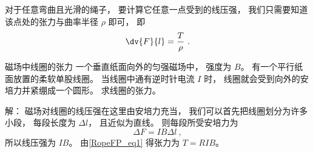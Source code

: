 对于任意弯曲且光滑的绳子， 要计算它任意一点受到的线压强， 我们只需要知道该点处的张力与曲率半径 $\rho$ 即可， 即
\begin{equation}
\dv{F}{l} = \frac{T}{\rho}~.
\end{equation}

\begin{example}{磁场中线圈的张力}
一个垂直纸面向外的匀强磁场中， 强度为 $B$。 有一个平行纸面放置的柔软单股线圈。 当线圈中通有逆时针电流 $I$ 时， 线圈就会受到向外的安培力并紧绷成一个圆形。 求线圈的张力。

解： 磁场对线圈的线压强在这里由安培力充当， 我们可以首先把线圈划分为许多小段， 每段长度为 $\Delta l$， 且近似为直线。 则每段所受安培力为
\begin{equation}
\Delta F = IB\Delta l~,
\end{equation}
所以线压强为 $IB$。 由\autoref{RopeFP_eq1} 得张力为 $T = RIB$。
\end{example}
